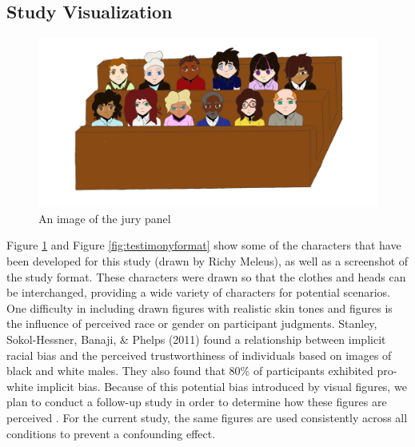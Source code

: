 \documentclass[print]{nuthesis}
\begin{document}
\begin{quote}
\end{quote}


\hypertarget{study-visualization}{%
\subsection{Study Visualization}\label{study-visualization}}

\begin{figure}

{\centering \includegraphics[width=\linewidth]{images/Jury} 

}

\caption{An image of the jury panel}\label{fig:jurypanel}
\end{figure}

Figure \ref{fig:jurypanel} and Figure \ref{fig:testimonyformat} show some of the characters that have been developed for this study (drawn by Richy Meleus), as well as a screenshot of the study format.
These characters were drawn so that the clothes and heads can be interchanged, providing a wide variety of characters for potential scenarios.
One difficulty in including drawn figures with realistic skin tones and figures is the influence of perceived race or gender on participant judgments.
Stanley, Sokol-Hessner, Banaji, \& Phelps (2011) found a relationship between implicit racial bias and the perceived trustworthiness of individuals based on images of black and white males.
They also found that 80\% of participants exhibited pro-white implicit bias.
Because of this potential bias introduced by visual figures, we plan to conduct a follow-up study in order to determine how these figures are perceived .
For the current study, the same figures are used consistently across all conditions to prevent a confounding effect.
\end{document}
